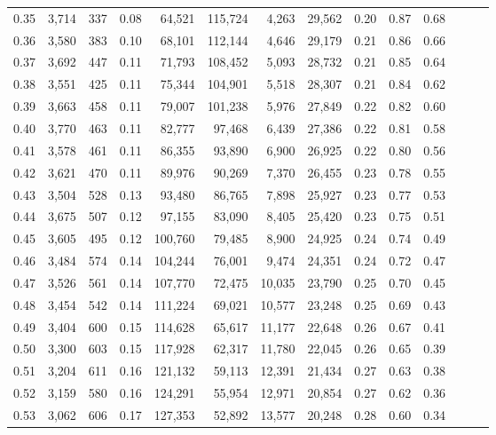 \begin{tabular}{rrrrrrrrrrrrrr}
0.35 &  3,714 &  337 &  0.08 &   64,521 &  115,724 &   4,263 &  29,562 &  0.20 &  0.87 &      0.68 \\
0.36 &  3,580 &  383 &  0.10 &   68,101 &  112,144 &   4,646 &  29,179 &  0.21 &  0.86 &      0.66 \\
0.37 &  3,692 &  447 &  0.11 &   71,793 &  108,452 &   5,093 &  28,732 &  0.21 &  0.85 &      0.64 \\
0.38 &  3,551 &  425 &  0.11 &   75,344 &  104,901 &   5,518 &  28,307 &  0.21 &  0.84 &      0.62 \\
0.39 &  3,663 &  458 &  0.11 &   79,007 &  101,238 &   5,976 &  27,849 &  0.22 &  0.82 &      0.60 \\
0.40 &  3,770 &  463 &  0.11 &   82,777 &   97,468 &   6,439 &  27,386 &  0.22 &  0.81 &      0.58 \\
0.41 &  3,578 &  461 &  0.11 &   86,355 &   93,890 &   6,900 &  26,925 &  0.22 &  0.80 &      0.56 \\
0.42 &  3,621 &  470 &  0.11 &   89,976 &   90,269 &   7,370 &  26,455 &  0.23 &  0.78 &      0.55 \\
0.43 &  3,504 &  528 &  0.13 &   93,480 &   86,765 &   7,898 &  25,927 &  0.23 &  0.77 &      0.53 \\
0.44 &  3,675 &  507 &  0.12 &   97,155 &   83,090 &   8,405 &  25,420 &  0.23 &  0.75 &      0.51 \\
0.45 &  3,605 &  495 &  0.12 &  100,760 &   79,485 &   8,900 &  24,925 &  0.24 &  0.74 &      0.49 \\
0.46 &  3,484 &  574 &  0.14 &  104,244 &   76,001 &   9,474 &  24,351 &  0.24 &  0.72 &      0.47 \\
0.47 &  3,526 &  561 &  0.14 &  107,770 &   72,475 &  10,035 &  23,790 &  0.25 &  0.70 &      0.45 \\
0.48 &  3,454 &  542 &  0.14 &  111,224 &   69,021 &  10,577 &  23,248 &  0.25 &  0.69 &      0.43 \\
0.49 &  3,404 &  600 &  0.15 &  114,628 &   65,617 &  11,177 &  22,648 &  0.26 &  0.67 &      0.41 \\
0.50 &  3,300 &  603 &  0.15 &  117,928 &   62,317 &  11,780 &  22,045 &  0.26 &  0.65 &      0.39 \\
0.51 &  3,204 &  611 &  0.16 &  121,132 &   59,113 &  12,391 &  21,434 &  0.27 &  0.63 &      0.38 \\
0.52 &  3,159 &  580 &  0.16 &  124,291 &   55,954 &  12,971 &  20,854 &  0.27 &  0.62 &      0.36 \\
0.53 &  3,062 &  606 &  0.17 &  127,353 &   52,892 &  13,577 &  20,248 &  0.28 &  0.60 &      0.34 \\

\end{tabular}
